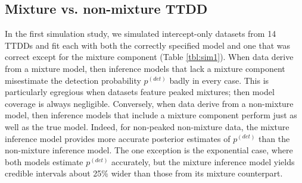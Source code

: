 \documentclass[useAMS,usenatbib,referee,12pt]{article}
\begin{document}
\subsection{Mixture vs. non-mixture TTDD}\label{sec:mixture}

In the first simulation study, we simulated intercept-only datasets from 14 TTDDs and fit each with both the correctly specified model and one that was correct except for the mixture component (Table \ref{tbl:sim1}).  
When data derive from a mixture model, then inference models that lack a mixture component misestimate the detection probability $p^{(det)}$ badly in every case.  
This is particularly egregious when datasets feature peaked mixtures; then model coverage is always negligible.  
Conversely, when data derive from a non-mixture model, then inference models that include a mixture component perform just as well as the true model.  
Indeed, for non-peaked non-mixture data, the mixture inference model provides more accurate posterior estimates of $p^{(det)}$ than the non-mixture inference model.  
The one exception is the exponential case, where both models estimate $p^{(det)}$ accurately, but the mixture inference model yields credible intervals about 25\% wider than those from its mixture counterpart.

\end{document}
